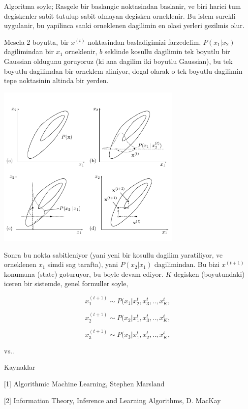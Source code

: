 \documentclass[12pt,fleqn]{article}\usepackage{../common}
\begin{document}
Algoritma soyle; Rasgele bir baslangic noktasindan baslanir, ve biri harici
tum degiskenler sabit tutulup sabit olmayan degisken orneklenir. Bu islem
surekli uygulanir, bu yapilinca sanki orneklenen dagilimin en olasi yerleri
gezilmis olur. 

Mesela 2 boyutta, bir $x^{(t)}$ noktasindan basladigimizi farzedelim,
$P(x_1|x_2)$ dagilimindan bir $x_1$ orneklenir, $b$ seklinde kosullu
dagilimin tek boyutlu bir Gaussian oldugunu goruyoruz (ki ana dagilim iki
boyutlu Gaussian), bu tek boyutlu dagilimdan bir orneklem aliniyor, dogal
olarak o tek boyutlu dagilimin tepe noktasinin altinda bir yerden.


\includegraphics[height=8cm]{gibbs.png}

Sonra bu nokta sabitleniyor (yani yeni bir kosullu dagilim yaratiliyor, ve
orneklenen $x_1$ simdi sag tarafta), yani $P(x_2|x_1)$ dagilimindan. Bu
bizi $x^{(t+1)}$ konumuna (state) goturuyor, bu boyle devam ediyor. $K$
degisken (boyutundaki) iceren bir sistemde, genel formuller soyle,

$$ x_1^{(t+1)} \sim P(x_1 | x_2^{t},x_3^{t},..,x_K^{t}, $$ 

$$ x_2^{(t+1)} \sim P(x_2 | x_1^{t},x_3^{t},..,x_K^{t}, $$ 

$$ x_3^{(t+1)} \sim P(x_3 | x_1^{t},x_2^{t},..,x_K^{t}, $$ 

vs..



Kaynaklar

[1] Algorithmic Machine Learning, Stephen Marsland

[2] Information Theory, Inference and Learning Algorithms, D. MacKay
\end{document}
